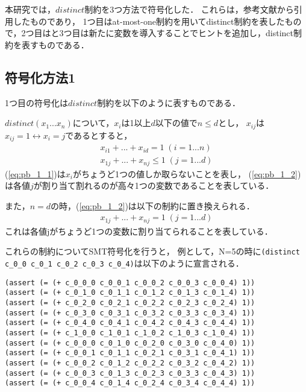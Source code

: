 \twocolumn

\onecolumn

本研究では，$distinct$制約を3つ方法で符号化した．
これらは，参考文献\cite{Ono19:ai}から引用したものであり，
1つ目はat-most-one制約を用いてdistinct制約を表したもので，2つ目はと3つ目は新たに変数を導入することでヒントを追加し，distinct制約を表すものである．


\subsection{符号化方法1}\label{sec:pb_1}
1つ目の符号化は$distinct$制約を以下のように表すものである．

$distinct(x_1 ... x_n)$について，$x_i$は1以上$d$以下の値で$n \leq d$とし，
$x_{ij}$は$x_{ij} = 1 \leftrightarrow x_i = j$であるとすると，
\begin{eqnarray}
    x_{i1} + ... + x_{id}=1 \; (i=1 ... n) \label{eq:pb_1_1}\\
    x_{1j} + ... + x_{nj}\leq1 \; (j=1 ... d) \label{eq:pb_1_2}
\end{eqnarray}
(\ref{eq:pb_1_1})は$x_i$がちょうど1つの値しか取らないことを表し，
(\ref{eq:pb_1_2})は各値$j$が割り当て割れるのが高々1つの変数であることを表している．

また，$n=d$の時，(\ref{eq:pb_1_2})は以下の制約に置き換えられる．
\begin{eqnarray}
    x_{1j} + ... + x_{nj}=1 \; (j=1 ... d) \label{eq:pb_1_3}
\end{eqnarray}
これは各値jがちょうど1つの変数に割り当てられることを表している．

これらの制約についてSMT符号化を行うと，
例として，N=5の時に\verb|(distinct c_0_0 c_0_1 c_0_2 c_0_3 c_0_4)|は以下のように宣言される．

\begin{verbatim}
(assert (= (+ c_0_0_0 c_0_0_1 c_0_0_2 c_0_0_3 c_0_0_4) 1))
(assert (= (+ c_0_1_0 c_0_1_1 c_0_1_2 c_0_1_3 c_0_1_4) 1))
(assert (= (+ c_0_2_0 c_0_2_1 c_0_2_2 c_0_2_3 c_0_2_4) 1))
(assert (= (+ c_0_3_0 c_0_3_1 c_0_3_2 c_0_3_3 c_0_3_4) 1))
(assert (= (+ c_0_4_0 c_0_4_1 c_0_4_2 c_0_4_3 c_0_4_4) 1))
(assert (= (+ c_1_0_0 c_1_0_1 c_1_0_2 c_1_0_3 c_1_0_4) 1))
(assert (= (+ c_0_0_0 c_0_1_0 c_0_2_0 c_0_3_0 c_0_4_0) 1))
(assert (= (+ c_0_0_1 c_0_1_1 c_0_2_1 c_0_3_1 c_0_4_1) 1))
(assert (= (+ c_0_0_2 c_0_1_2 c_0_2_2 c_0_3_2 c_0_4_2) 1))
(assert (= (+ c_0_0_3 c_0_1_3 c_0_2_3 c_0_3_3 c_0_4_3) 1))
(assert (= (+ c_0_0_4 c_0_1_4 c_0_2_4 c_0_3_4 c_0_4_4) 1))
\end{verbatim}


